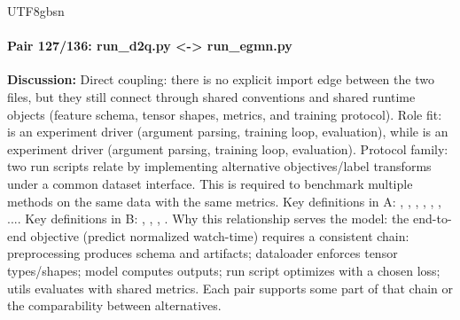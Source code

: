 \documentclass[11pt]{article}
\begin{document}
\begin{CJK*}{UTF8}{gbsn}
\paragraph{Pair 127/136: run\_d2q.py <-> run\_egmn.py}
\textbf{Discussion:} Direct coupling: there is no explicit import edge between the two files, but they still connect through shared conventions and shared runtime objects (feature schema, tensor shapes, metrics, and training protocol). Role fit: \texttt{} is an experiment driver (argument parsing, training loop, evaluation), while \texttt{} is an experiment driver (argument parsing, training loop, evaluation). Protocol family: two run scripts relate by implementing alternative objectives/label transforms under a common dataset interface. This is required to benchmark multiple methods on the same data with the same metrics. Key definitions in A: \texttt{}, \texttt{}, \texttt{}, \texttt{}, \texttt{}, \texttt{}, .... Key definitions in B: \texttt{}, \texttt{}, \texttt{}, \texttt{}. Why this relationship serves the model: the end-to-end objective (predict normalized watch-time) requires a consistent chain: preprocessing produces schema and artifacts; dataloader enforces tensor types/shapes; model computes outputs; run script optimizes with a chosen loss; utils evaluates with shared metrics. Each pair supports some part of that chain or the comparability between alternatives.


\end{CJK*}
\end{document}
